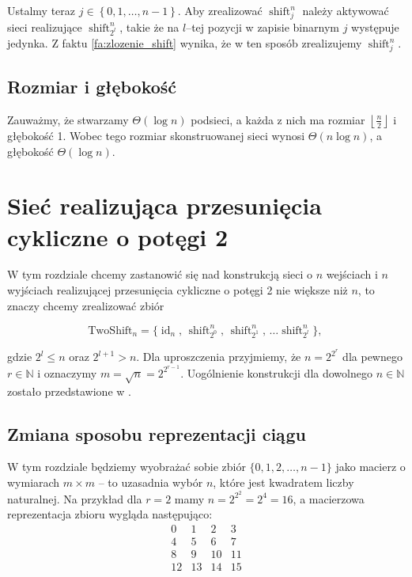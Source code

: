 \documentclass[a4paper]{article}
\newcommand{\shift}[2]{\operatorname{shift}_{#2}^{#1}}
\newcommand{\id}[1]{\operatorname{id}_{#1}}
\newcommand{\tc}{\text{, }}
\newcommand{\floor}[1]{\left\lfloor #1 \right\rfloor}
\newcommand{\twoshift}[1]{\text{TwoShift}_{#1}}
\newcommand{\N}{\mathbb{N}}
\newcommand{\lt}{\left}
\newcommand{\rt}{\right}
\theoremstyle{definition}
\begin{document}
\vspace{.5em}

Ustalmy teraz \(j \in \lt\{ 0, 1, \ldots, n-1 \rt\}\). Aby zrealizować \(\shift n j\) należy aktywować sieci realizujące \(\shift n {2^l}\), takie że na \(l\)--tej pozycji w zapisie binarnym \(j\) występuje jedynka. Z  faktu \ref{fa:zlozenie_shift} wynika, że w ten sposób zrealizujemy \(\shift n j\). 

\subsection{Rozmiar i głębokość}

Zauważmy, że stwarzamy \(\Theta(\log n)\) podsieci, a każda z nich ma rozmiar  \(\floor{\frac n 2}\) i głębokość 1. Wobec tego rozmiar skonstruowanej sieci wynosi \(\Theta(n \log n)\), a głębokość \(\Theta(\log n)\).


\section{Sieć realizująca przesunięcia cykliczne o potęgi 2}

W tym rozdziale chcemy zastanowić się nad konstrukcją sieci o \(n\) wejściach i \(n\) wyjściach realizującej przesunięcia cykliczne o potęgi 2 nie większe niż \(n\), to znaczy chcemy zrealizować zbiór

\[
\twoshift{n} = \{ \id n \tc \shift n {2^0} \tc \shift n {2^1} \tc \ldots \shift n {2^l}\} \tc
\]

gdzie \(2^l \leq n\) oraz \(2^{l+1} > n\). Dla uproszczenia przyjmiemy, że \(n = 2^{2^r}\) dla pewnego \(r \in \N\) i oznaczymy \( m = \sqrt{n} = 2^{2^{r-1}} \). Uogólnienie konstrukcji dla dowolnego \(n \in \N\) zostało przedstawione w \cite{klo}.


\subsection{Zmiana sposobu reprezentacji ciągu}

W tym rozdziale będziemy wyobrażać sobie zbiór \(\{0, 1, 2, \ldots, n-1\}\) jako macierz o wymiarach \(m \times m\) -- to uzasadnia wybór \(n\), które jest kwadratem liczby naturalnej. Na przykład dla \(r = 2\) mamy \(n = 2^{2^2} = 2^4 = 16\), a macierzowa reprezentacja zbioru wygląda następująco:
\[
\begin{matrix}
 0 &  1 &  2 &  3 \\
 4 &  5 &  6 &  7 \\
 8 &  9 & 10 & 11 \\
12 & 13 & 14 & 15
\end{matrix}
\]
\end{document}
